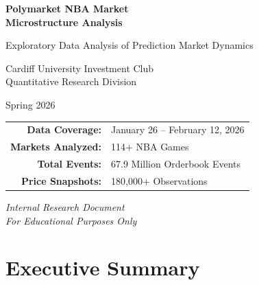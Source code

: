 \documentclass[11pt, a4paper]{report}
\begin{document}
\begin{titlepage}
    \centering
    \vspace*{2cm}

    {\Huge\bfseries\color{cuicblue} Polymarket NBA Market\\[0.3cm] Microstructure Analysis}

    \vspace{1cm}

    {\Large Exploratory Data Analysis of Prediction Market Dynamics}

    \vspace{2cm}

    {\large Cardiff University Investment Club}\\[0.5cm]
    {\large Quantitative Research Division}

    \vspace{1.5cm}

    {\large Spring 2026}

    \vspace{2cm}

    \begin{tabular}{rl}
        \textbf{Data Coverage:} & January 26 -- February 12, 2026 \\[0.3cm]
        \textbf{Markets Analyzed:} & 114+ NBA Games \\[0.3cm]
        \textbf{Total Events:} & 67.9 Million Orderbook Events \\[0.3cm]
        \textbf{Price Snapshots:} & 180,000+ Observations \\
    \end{tabular}

    \vfill

    \textit{Internal Research Document}\\
    \textit{For Educational Purposes Only}

\end{titlepage}

\newpage
\chapter*{Executive Summary}
\end{document}
